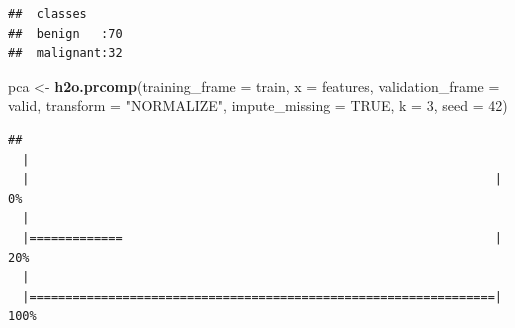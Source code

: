 \documentclass[]{article}
\newenvironment{Shaded}{\begin{snugshade}}{\end{snugshade}}
\newcommand{\KeywordTok}[1]{\textcolor[rgb]{0.13,0.29,0.53}{\textbf{{#1}}}}
\newcommand{\DataTypeTok}[1]{\textcolor[rgb]{0.13,0.29,0.53}{{#1}}}
\newcommand{\DecValTok}[1]{\textcolor[rgb]{0.00,0.00,0.81}{{#1}}}
\newcommand{\FloatTok}[1]{\textcolor[rgb]{0.00,0.00,0.81}{{#1}}}
\newcommand{\StringTok}[1]{\textcolor[rgb]{0.31,0.60,0.02}{{#1}}}
\newcommand{\OtherTok}[1]{\textcolor[rgb]{0.56,0.35,0.01}{{#1}}}
\newcommand{\NormalTok}[1]{{#1}}
\begin{document}
\begin{verbatim}
##  classes      
##  benign   :70 
##  malignant:32
\end{verbatim}

\begin{Shaded}
\begin{Highlighting}[]
\NormalTok{pca <-}\StringTok{ }\KeywordTok{h2o.prcomp}\NormalTok{(}\DataTypeTok{training_frame =} \NormalTok{train,}
           \DataTypeTok{x =} \NormalTok{features,}
           \DataTypeTok{validation_frame =} \NormalTok{valid,}
           \DataTypeTok{transform =} \StringTok{"NORMALIZE"}\NormalTok{,}
           \DataTypeTok{impute_missing =} \OtherTok{TRUE}\NormalTok{,}
           \DataTypeTok{k =} \DecValTok{3}\NormalTok{,}
           \DataTypeTok{seed =} \DecValTok{42}\NormalTok{)}
\end{Highlighting}
\end{Shaded}

\begin{verbatim}
## 
  |                                                                       
  |                                                                 |   0%
  |                                                                       
  |=============                                                    |  20%
  |                                                                       
  |=================================================================| 100%
\end{verbatim}

\begin{Shaded}
\end{Shaded}
\end{document}
